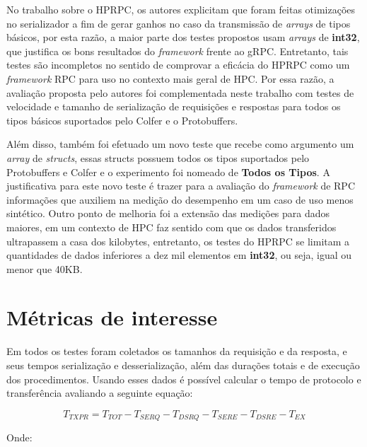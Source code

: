 No trabalho sobre o HPRPC, os autores explicitam que foram feitas otimizações no serializador a fim de gerar ganhos no caso da transmissão de \textit{arrays} de tipos básicos, por esta razão, a maior parte dos testes propostos usam \textit{arrays} de \textbf{int32}, que justifica os bons resultados do \textit{framework} frente ao gRPC. Entretanto, tais testes são incompletos no sentido de comprovar a eficácia do HPRPC como um \textit{framework} RPC para uso no contexto mais geral de HPC. Por essa razão, a avaliação proposta pelo autores foi complementada neste trabalho com testes de velocidade e tamanho de serialização de requisições e respostas para todos os tipos básicos suportados pelo Colfer e o Protobuffers. 

Além disso, também foi efetuado um novo teste que recebe como argumento um \textit{array} de \textit{structs}, essas structs possuem todos os tipos suportados pelo Protobuffers e Colfer e o experimento foi nomeado de \textbf{Todos os Tipos}. A justificativa para este novo teste é trazer para a avaliação do \textit{framework} de RPC informações que auxiliem na medição do desempenho em um caso de uso menos sintético. Outro ponto de melhoria foi a extensão das medições para dados maiores, em um contexto de HPC faz sentido com que os dados transferidos ultrapassem a casa dos kilobytes, entretanto, os testes do HPRPC se limitam a quantidades de dados inferiores a dez mil elementos em \textbf{int32}, ou seja, igual ou menor que 40KB.


\section{Métricas de interesse}
\label{sec:metricas_interesse}

Em todos os testes foram coletados os tamanhos da requisição e da resposta, e seus tempos serialização e desserialização, além das durações totais e de execução dos procedimentos. Usando esses dados é possível calcular o tempo de protocolo e transferência avaliando a seguinte equação:

\begin{equation}  
\label{eq:tempo_transmissao_protocolo}
    T_{TXPR}  =  T_{TOT} - T_{SERQ} - T_{DSRQ} - T_{SERE} - T_{DSRE} - T_{EX}
\end{equation}

Onde: 

